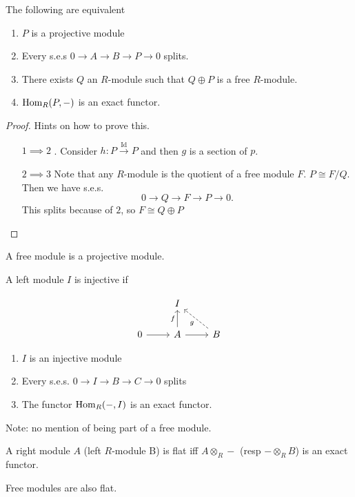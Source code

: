 \begin{prop}
    The following are equivalent
    \begin{enumerate}[(1)]
        \item  $P$ is a projective module
        \item Every s.e.s $0 \to  A \to  B \to  P \to  0$ splits.
        \item  There exists $Q$ an  $R$-module such that $Q \oplus P$ is  a free $R$-module.
        \item $\operatorname{Hom}_R(P, -)$ is an exact functor.
    \end{enumerate}
\end{prop}
\begin{proof}
    Hints on how to prove this.
    \begin{itemize}
        \item [$1 \implies 2$]. Consider $h:P \xrightarrow{\operatorname{Id}}   P$ and then $g$ is a section of  $p$. 
        \item [$2 \implies 3$] Note that any $R$-module is the quotient of a free module $F$.
            $P \cong F / Q$.
            Then we have s.e.s.
             \[
            0 \to  Q \to  F \to  P \to  0
            .\] 
            This splits because of $2$, so  $F \cong Q \oplus P$
    \end{itemize}
\end{proof}

\begin{remark}
    A free module is a projective module.
\end{remark}

\begin{definition}
    A left module $I$ is injective if

    \[
        \begin{tikzcd}
            & I\\
            0 \arrow[r, ""] & A\arrow[u, "f"] \arrow[r, " "] & B \arrow[ul, dashed, "g"]
        \end{tikzcd}
    \]
\end{definition}

\begin{prop}
    \begin{enumerate}[(1)]
        \item $I$ is an injective module
        \item Every s.e.s. $0 \to  I \to  B \to  C \to  0$ splits
        \item The functor $ \operatorname{Hom}_{R}(-, I)$ is an exact functor.
    \end{enumerate}
\end{prop}

Note: no mention of being part of a free module.


\begin{definition}
    A right module $A$ (left  $R$-module  B)
    is flat iff $ A \otimes_R - $ (resp $- \otimes_R B$) is an exact functor.
\end{definition}
\begin{theorem}
    Free modules are also flat.
\end{theorem}
